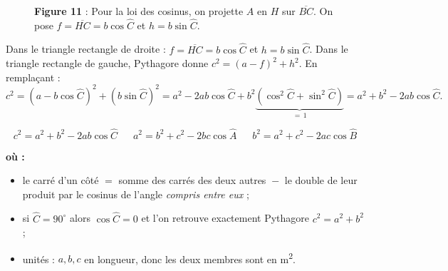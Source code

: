 \documentclass[11pt,a4paper]{article}
\newenvironment{ou}{%
  \par\smallskip\noindent\textbf{où :}\nopagebreak
  \begin{itemize}[leftmargin=1.8em,topsep=2pt,itemsep=1.5pt,parsep=0pt]}%
  {\end{itemize}}
\newcommand{\degr}{^{\circ}}
\begin{document}
\begin{figure}[h]
\centering
{}
\caption*{\small\textbf{\textcolor{primary}{Figure 11}} : Pour la loi des cosinus, on projette $A$
en $H$ sur $\overline{BC}$. On pose $f=\overline{HC}=b\cos\hat C$ et $h=b\sin\hat C$.}
\end{figure}

\begin{theoreme}
Dans le triangle rectangle de droite : $f=\overline{HC}=b\cos\hat C$ et $h=b\sin\hat C$. Dans le
triangle rectangle de gauche, Pythagore donne $c^2=(a-f)^2+h^2$. En remplaçant :
\[
c^2=(a-b\cos\hat C)^2+(b\sin\hat C)^2
=a^2-2ab\cos\hat C+b^2\underbrace{(\cos^2\hat C+\sin^2\hat C)}_{=\,1}
=a^2+b^2-2ab\cos\hat C.
\]
\end{theoreme}

\begin{formule}
\[
\boxed{\;c^2=a^2+b^2-2ab\cos\hat C\;}\quad
\boxed{\;a^2=b^2+c^2-2bc\cos\hat A\;}\quad
\boxed{\;b^2=a^2+c^2-2ac\cos\hat B\;}
\]
\begin{ou}
  \item le carré d'un côté ${}={}$ somme des carrés des deux autres ${}-{}$ le double de leur produit
        par le cosinus de l'angle \emph{compris entre eux} ;
  \item si $\hat C=90\degr$ alors $\cos\hat C=0$ et l'on retrouve exactement Pythagore
        $c^2=a^2+b^2$ ;
  \item unités : $a,b,c$ en longueur, donc les deux membres sont en \si{\metre\squared}.
\end{ou}
\end{formule}
\end{document}
